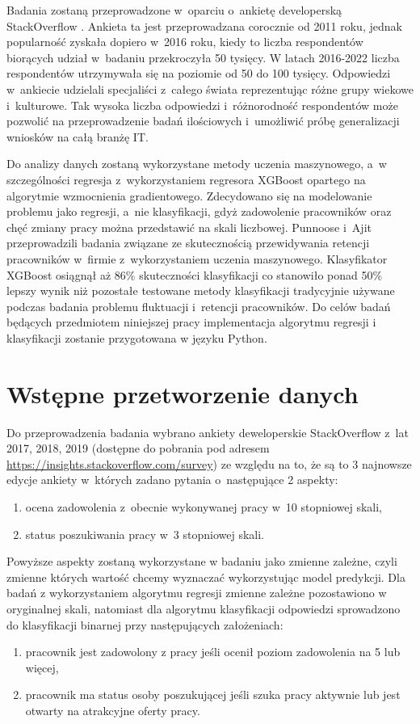 Badania zostaną przeprowadzone w~oparciu o~ankietę developerską StackOverflow \cite{so-survey-info}.
Ankieta ta jest przeprowadzana corocznie od 2011 roku, jednak popularność zyskała dopiero w~2016 roku, kiedy to liczba respondentów biorących udział w~badaniu przekroczyła 50 tysięcy.
W latach 2016-2022 liczba respondentów utrzymywała się na poziomie od 50 do 100 tysięcy.
Odpowiedzi w~ankiecie udzielali specjaliści z~całego świata reprezentując różne grupy wiekowe i~kulturowe.
Tak wysoka liczba odpowiedzi i~różnorodność respondentów może pozwolić na przeprowadzenie badań ilościowych i~umożliwić próbę generalizacji wniosków na całą branżę IT.


Do analizy danych zostaną wykorzystane metody uczenia maszynowego, a~w szczególności regresja z~wykorzystaniem regresora XGBoost opartego na algorytmie wzmocnienia gradientowego.
Zdecydowano się na modelowanie problemu jako regresji, a~nie klasyfikacji, gdyż zadowolenie pracowników oraz chęć zmiany pracy można przedstawić na skali liczbowej.
Punnoose i~Ajit \cite{punnoose-2016} przeprowadzili badania związane ze skutecznością przewidywania retencji pracowników w~firmie z~wykorzystaniem uczenia maszynowego.
Klasyfikator XGBoost osiągnął aż 86\% skuteczności klasyfikacji co stanowiło ponad 50\% lepszy wynik niż pozostałe testowane metody klasyfikacji tradycyjnie używane podczas badania problemu fluktuacji i~retencji pracowników.
Do celów badań będących przedmiotem niniejszej pracy implementacja algorytmu regresji i klasyfikacji zostanie przygotowana w języku Python.


\section{Wstępne przetworzenie danych}\label{sec:analysis:preprocessing}
Do przeprowadzenia badania wybrano ankiety deweloperskie StackOverflow z~lat 2017, 2018, 2019 (dostępne do pobrania pod adresem \url{https://insights.stackoverflow.com/survey}) ze względu na to, że są to 3 najnowsze edycje ankiety w~których zadano pytania o~następujące 2 aspekty:
\begin{enumerate}
    \item ocena zadowolenia z~obecnie wykonywanej pracy w~10 stopniowej skali,
    \item status poszukiwania pracy w~3 stopniowej skali.
    \end{enumerate}

Powyższe aspekty zostaną wykorzystane w badaniu jako zmienne zależne, czyli zmienne których wartość chcemy wyznaczać wykorzystując model predykcji.
Dla badań z wykorzystaniem algorytmu regresji zmienne zależne pozostawiono w oryginalnej skali,
natomiast dla algorytmu klasyfikacji odpowiedzi sprowadzono do klasyfikacji binarnej przy następujących założeniach:
\begin{enumerate}
    \item pracownik jest zadowolony z pracy jeśli ocenił poziom zadowolenia na 5 lub więcej,
    \item pracownik ma status osoby poszukującej jeśli szuka pracy aktywnie lub jest otwarty na atrakcyjne oferty pracy.
    \end{enumerate}

